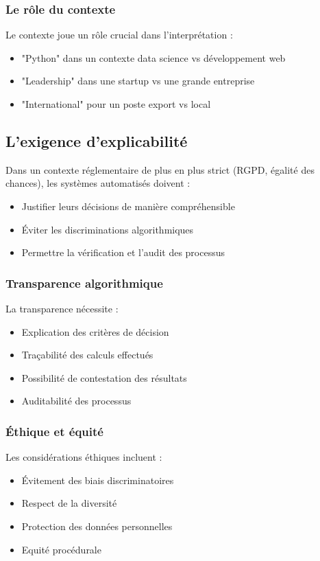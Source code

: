 \documentclass[12pt,a4paper]{report}
\begin{document}
\subsubsection{Le rôle du contexte}

Le contexte joue un rôle crucial dans l'interprétation :
\begin{itemize}
\item "Python" dans un contexte data science vs développement web
\item "Leadership" dans une startup vs une grande entreprise
\item "International" pour un poste export vs local
\end{itemize}

\subsection{L'exigence d'explicabilité}

Dans un contexte réglementaire de plus en plus strict (RGPD, égalité des chances), les systèmes automatisés doivent :
\begin{itemize}
\item Justifier leurs décisions de manière compréhensible
\item Éviter les discriminations algorithmiques
\item Permettre la vérification et l'audit des processus
\end{itemize}

\subsubsection{Transparence algorithmique}

La transparence nécessite :
\begin{itemize}
\item Explication des critères de décision
\item Traçabilité des calculs effectués
\item Possibilité de contestation des résultats
\item Auditabilité des processus
\end{itemize}

\subsubsection{Éthique et équité}

Les considérations éthiques incluent :
\begin{itemize}
\item Évitement des biais discriminatoires
\item Respect de la diversité
\item Protection des données personnelles
\item Equité procédurale
\end{itemize}
\end{document}
